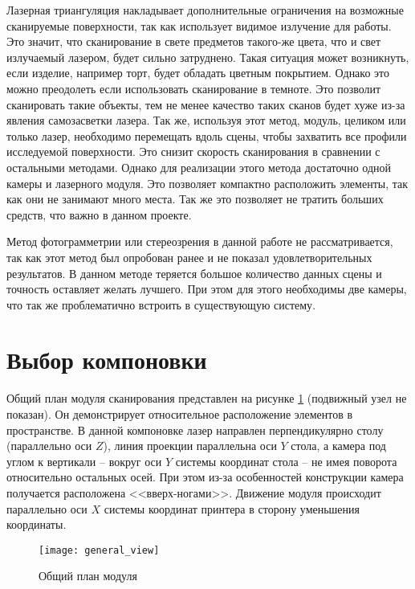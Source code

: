         Лазерная триангуляция накладывает дополнительные ограничения на возможные сканируемые поверхности, так как использует видимое излучение для работы. Это значит, что сканирование в свете предметов такого-же цвета, что и свет излучаемый лазером, будет сильно затруднено. Такая ситуация может возникнуть, если изделие, например торт, будет обладать цветным покрытием. Однако это можно преодолеть если использовать сканирование в темноте. Это позволит сканировать такие объекты, тем не менее качество таких сканов будет хуже из-за явления самозасветки лазера.
        Так же, используя этот метод, модуль, целиком или только лазер, необходимо перемещать вдоль сцены, чтобы захватить все профили исследуемой поверхности. Это снизит скорость сканирования в сравнении с остальными методами.
        Однако для реализации этого метода достаточно одной камеры и лазерного модуля. Это позволяет компактно расположить элементы, так как они не занимают много места. Так же это позволяет не тратить больших средств, что важно в данном проекте.

        Метод фотограмметрии или стереозрения в данной работе не рассматривается, так как этот метод был опробован ранее и не показал удовлетворительных результатов. В данном методе теряется большое количество данных сцены и точность оставляет желать лучшего. При этом для этого необходимы две камеры, что так же проблематично встроить в существующую систему\cite{SkripkoPASEKA}.
        
    \section{Выбор компоновки}
        Общий план модуля сканирования представлен на рисунке \ref{pic:general_view} (подвижный узел не показан). Он демонстрирует относительное расположение элементов в пространстве. В данной компоновке лазер направлен перпендикулярно столу (параллельно оси $ Z $), линия проекции параллельна оси $ Y $ стола, а камера под углом к вертикали -- вокруг оси $ Y $ системы координат стола -- не имея поворота относительно остальных осей. При этом из-за особенностей конструкции камера получается расположена <<вверх-ногами>>. Движение модуля происходит параллельно оси $ X $ системы координат принтера в сторону уменьшения координаты.


        \begin{figure}[H]
            \centering
            \texttt{[image: general\_view]}
            \caption{Общий план модуля}
            \label{pic:general_view}
        \end{figure}

